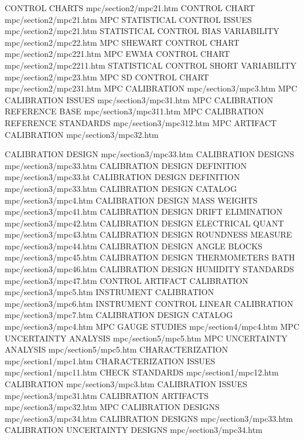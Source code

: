 CONTROL CHARTS                          mpc/section2/mpc21.htm
CONTROL CHART                           mpc/section2/mpc21.htm
MPC STATISTICAL CONTROL ISSUES          mpc/section2/mpc21.htm
STATISTICAL CONTROL BIAS VARIABILITY    mpc/section2/mpc22.htm
MPC SHEWART CONTROL CHART               mpc/section2/mpc221.htm
MPC EWMA CONTROL CHART                  mpc/section2/mpc2211.htm
STATISTICAL CONTROL SHORT VARIABILITY   mpc/section2/mpc23.htm
MPC SD CONTROL CHART                    mpc/section2/mpc231.htm
MPC CALIBRATION                         mpc/section3/mpc3.htm
MPC CALIBRATION ISSUES                  mpc/section3/mpc31.htm
MPC CALIBRATION REFERENCE BASE          mpc/section3/mpc311.htm
MPC CALIBRATION REFERENCE STANDARDS     mpc/section3/mpc312.htm
MPC ARTIFACT CALIBRATION                mpc/section3/mpc32.htm

CALIBRATION DESIGN                      mpc/section3/mpc33.htm
CALIBRATION DESIGNS                     mpc/section3/mpc33.htm
CALIBRATION DESIGN DEFINITION           mpc/section3/mpc33.ht
CALIBRATION DESIGN DEFINITION           mpc/section3/mpc33.htm
CALIBRATION DESIGN CATALOG              mpc/section3/mpc4.htm
CALIBRATION DESIGN MASS WEIGHTS         mpc/section3/mpc41.htm
CALIBRATION DESIGN DRIFT ELIMINATION    mpc/section3/mpc42.htm
CALIBRATION DESIGN ELECTRICAL QUANT     mpc/section3/mpc43.htm
CALIBRATION DESIGN ROUNDNESS MEASURE    mpc/section3/mpc44.htm
CALIBRATION DESIGN ANGLE BLOCKS         mpc/section3/mpc45.htm
CALIBRATION DESIGN THERMOMETERS BATH    mpc/section3/mpc46.htm
CALIBRATION DESIGN HUMIDITY STANDARDS   mpc/section3/mpc47.htm
CONTROL ARTIFACT CALIBRATION            mpc/section3/mpc5.htm
INSTRUMENT CALIBRATION                  mpc/section3/mpc6.htm
INSTRUMENT CONTROL LINEAR CALIBRATION   mpc/section3/mpc7.htm
CALIBRATION DESIGN CATALOG              mpc/section3/mpc4.htm
MPC GAUGE STUDIES                       mpc/section4/mpc4.htm
MPC UNCERTAINTY ANALYSIS                mpc/section5/mpc5.htm
MPC UNCERTAINTY ANALYSIS                mpc/section5/mpc5.htm
CHARACTERIZATION                        mpc/section1/mpc1.htm
CHARACTERIZATION ISSUES                 mpc/section1/mpc11.htm
CHECK STANDARDS                         mpc/section1/mpc12.htm
CALIBRATION                             mpc/section3/mpc3.htm
CALIBRATION ISSUES                      mpc/section3/mpc31.htm
CALIBRATION ARTIFACTS                   mpc/section3/mpc32.htm
MPC CALIBRATION DESIGNS                 mpc/section3/mpc34.htm
CALIBRATION DESIGNS                     mpc/section3/mpc33.htm
CALIBRATION UNCERTAINTY DESIGNS         mpc/section3/mpc34.htm
